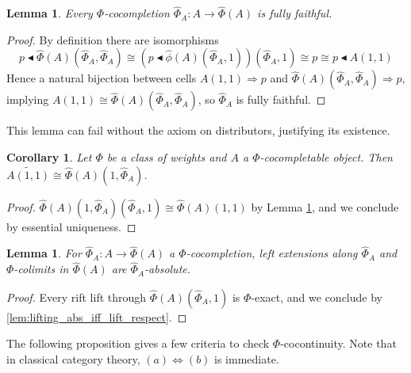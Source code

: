 \documentclass[10pt,a4paper]{article}
\newcommand{\To}{\Rightarrow}
\newcommand{\coce}[2]{{\hat{#1}}_{#2}}
\newcommand{\coc}[2]{{\widehat{#1}}(#2)}
\newcommand{\rift}{\mathbin{\blacktriangleleft}}
\newcommand{\simeqq}{\cong}
\theoremstyle{plain}
\newtheorem{corollary}[theorem]{Corollary}
\newtheorem{lemma}[theorem]{Lemma}
\theoremstyle{definition}
\theoremstyle{remark}
\begin{document}
\begin{lemma}
    \label{lem:cocomp_ff}
    Every $\Phi$-cocompletion $\coce\Phi A : A \to \coc\Phi A$ is fully faithful.
\end{lemma}

\begin{proof}
    By definition there are isomorphisms
    $$p\rift\coc\Phi A(\coce\Phi A, \coce\Phi A) \simeqq (p\rift\coc\phi A(\coce\Phi A, 1))(\coce\Phi A, 1) \simeqq p \simeqq p\rift A(1, 1)$$
    Hence a natural bijection between cells $A(1, 1)\To p$ and $\coc\Phi A(\coce\Phi A, \coce\Phi A) \To p$, implying $A(1, 1)\simeqq\coc\Phi A(\coce\Phi A, \coce\Phi A)$, so $\coce\Phi A$ is fully faithful.
\end{proof}

This lemma can fail without the axiom on distributors, justifying its existence.

\begin{corollary}
    Let $\Phi$ be a class of weights and $A$ a $\Phi$-cocompletable object. Then $\widetilde{A(1, 1)}\simeqq\coc\Phi A(1, \coce\Phi A)$.
\end{corollary}

\begin{proof}
    $\coc\Phi A(1, \coce\Phi A)(\coce\Phi A, 1) \simeqq \coc\Phi A(1, 1)$ by Lemma \ref{lem:cocomp_ff}, and we conclude by essential uniqueness.
\end{proof}

\begin{lemma}
    \label{lem:cocomp_leftext_abs}
    For $\coce\Phi A : A \to \coc\Phi A$ a $\Phi$-cocompletion, left extensions along $\coce\Phi A$ and $\Phi$-colimits in $\coc\Phi A$ are $\coce\Phi A$-absolute.
\end{lemma}

\begin{proof}
    Every rift lift through $\coc\Phi A(\coce\Phi A, 1)$ is $\Phi$-exact, and we conclude by \ref{lem:lifting_abs_iff_lift_respect}.
\end{proof}

The following proposition gives a few criteria to check $\Phi$-cocontinuity. Note that in classical category theory, $(a)\iff(b)$ is immediate.
\end{document}
